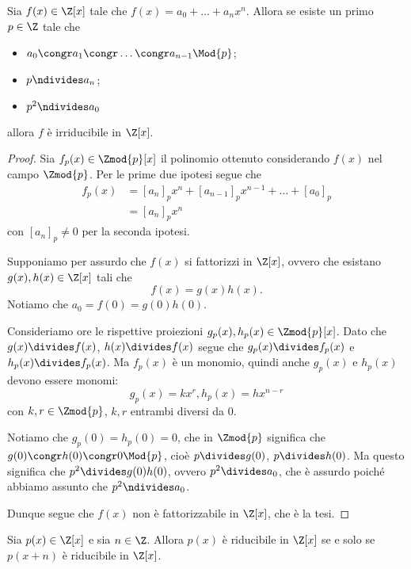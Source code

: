 \begin{proposition}
     \label{criterio_eisenstein}
    Sia $f(x) \in \Z[x]$ tale che $f(x) = a_0 + \dots + a_nx^n$. Allora se esiste un primo $p \in \Z$ tale che \begin{itemize}
        \item $a_0 \congr a_1 \congr \dots \congr a_{n-1} \Mod{p}$;
        \item $p \ndivides a_n$;
        \item $p^2 \ndivides a_0$
    \end{itemize}
    allora $f$ è irriducibile in $\Z[x]$.
\end{proposition}
\begin{proof}
    Sia $f_p(x) \in \Zmod{p}[x]$ il polinomio ottenuto considerando $f(x)$ nel campo $\Zmod{p}$. Per le prime due ipotesi segue che \begin{align*}
        f_p(x) &= [a_n]_px^n + [a_{n-1}]_px^{n-1} + \dots + [a_0]_p \\
        &= [a_n]_px^n
    \end{align*} con $[a_n]_p \neq 0$ per la seconda ipotesi.

    Supponiamo per assurdo che $f(x)$ si fattorizzi in $\Z[x]$, ovvero che esistano $g(x), h(x) \in \Z[x]$ tali che \[
        f(x) = g(x)h(x).
    \] Notiamo che $a_0 = f(0) = g(0)h(0)$. 
    
    Consideriamo ore le rispettive proiezioni $g_p(x), h_p(x) \in \Zmod{p}[x]$. Dato che $g(x) \divides f(x)$, $h(x) \divides f(x)$ segue che $g_p(x) \divides f_p(x)$ e $h_p(x) \divides f_p(x)$. Ma $f_p(x)$ è un monomio, quindi anche $g_p(x)$ e $h_p(x)$ devono essere monomi:
    \[
        g_p(x) = kx^r, h_p(x) = hx^{n-r}    
    \] con $k, r \in \Zmod{p}$, $k, r$ entrambi diversi da $0$.

    Notiamo che $g_p(0) = h_p(0) = 0$, che in $\Zmod{p}$ significa che $g(0) \congr h(0) \congr 0 \Mod{p}$, cioè $p \divides g(0)$, $p \divides h(0)$. Ma questo significa che $p^2 \divides g(0)h(0)$, ovvero $p^2 \divides a_0$, che è assurdo poiché abbiamo assunto che $p^2 \ndivides a_0$.

    Dunque segue che $f(x)$ non è fattorizzabile in $\Z[x]$, che è la tesi.
\end{proof}

\begin{proposition}
     \label{criterio_sost}
    Sia $p(x) \in \Z[x]$ e sia $n \in \Z$. Allora $p(x)$ è riducibile in $\Z[x]$ se e solo se $p(x+n)$ è riducibile in $\Z[x]$.
\end{proposition}


